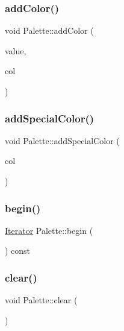 \subsubsection{\texorpdfstring{addColor()}{addColor()}}
{\footnotesize\ttfamily void Palette\+::add\+Color (\begin{DoxyParamCaption}\item[{double}]{value,  }\item[{const Q\+Color \&}]{col }\end{DoxyParamCaption})\hspace{0.3cm}{\ttfamily [inline]}}

\mbox{\label{class_palette_ae652fdefe115c2b6214901b1ec77b007}} 
\subsubsection{\texorpdfstring{addSpecialColor()}{addSpecialColor()}}
{\footnotesize\ttfamily void Palette\+::add\+Special\+Color (\begin{DoxyParamCaption}\item[{const Q\+Color \&}]{col }\end{DoxyParamCaption})\hspace{0.3cm}{\ttfamily [inline]}}

\mbox{\label{class_palette_a64b2a69c619f433af4aafb480e6abacf}} 
\subsubsection{\texorpdfstring{begin()}{begin()}}
{\footnotesize\ttfamily \mbox{\hyperlink{class_palette_adbfe061d30e0b5f90145bd302003fab0}{Iterator}} Palette\+::begin (\begin{DoxyParamCaption}{ }\end{DoxyParamCaption}) const\hspace{0.3cm}{\ttfamily [inline]}}

\mbox{\label{class_palette_aabc53a36cbf3e091f2a5f79f52208a45}} 
\subsubsection{\texorpdfstring{clear()}{clear()}}
{\footnotesize\ttfamily void Palette\+::clear (\begin{DoxyParamCaption}{ }\end{DoxyParamCaption})\hspace{0.3cm}{\ttfamily [inline]}}

